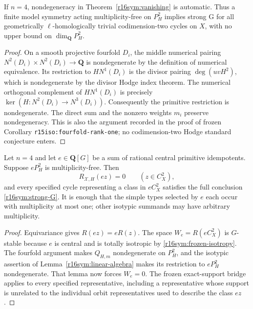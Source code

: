 \begin{corollary}
\label{r16sym:fourfold}
If $n=4$, nondegeneracy in
Theorem~\ref{r16sym:vanishing} is automatic.  Thus a finite
model symmetry acting multiplicity-free on $P_H^2$ implies
strong G for all geometrically $\ell$-homologically trivial
codimension-two cycles on $X$, with no upper bound on
$\dim_{\mathbf Q}P_H^2$.
\end{corollary}

\begin{proof}
On a smooth projective fourfold $D_i$, the middle numerical
pairing $N^2(D_i)\times N^2(D_i)\to\mathbf Q$ is
nondegenerate by the definition of numerical equivalence.
Its restriction to $HN^1(D_i)$ is the divisor pairing
$\deg(uvH^2)$, which is nondegenerate by the divisor Hodge
index theorem.  The numerical orthogonal complement of
$HN^1(D_i)$ is precisely
$\ker(H:N^2(D_i)\to N^3(D_i))$.  Consequently the primitive
restriction is nondegenerate.  The direct sum and the
nonzero weights $m_i$ preserve nondegeneracy.  This is also
the argument recorded in the proof of frozen Corollary
\texttt{r15iso:fourfold-rank-one}; no codimension-two Hodge
standard conjecture enters.
\end{proof}

\begin{corollary}
\label{r16sym:sectors}
Let $n=4$ and let $e\in\mathbf Q[G]$ be a sum of rational
central primitive idempotents.  Suppose $eP_H^2$ is
multiplicity-free.  Then
\[
                 R_{\mathcal X,H}(ez)=0
                              \qquad(z\in C_X^2),
\tag{ER16.8}\label{r16sym:isotypic-vanishing}
\]
and every specified cycle representing a class in $eC_X^2$
satisfies the full conclusion \eqref{r16sym:strong-G}.
It is enough that the simple types selected by $e$ each
occur with multiplicity at most one; other isotypic
summands may have arbitrary multiplicity.
\end{corollary}

\begin{proof}
Equivariance gives $R(ez)=eR(z)$.  The space
$W_e=R(eC_X^2)$ is $G$-stable because $e$ is central and
is totally isotropic by \eqref{r16sym:frozen-isotropy}.
The fourfold argument makes $Q_{H,m}$ nondegenerate on
$P_H^2$, and the isotypic assertion of
Lemma~\ref{r16sym:linear-algebra} makes its restriction to
$eP_H^2$ nondegenerate.  That lemma now forces $W_e=0$.
The frozen exact-support bridge applies to every specified
representative, including a representative whose support
is unrelated to the individual orbit representatives
used to describe the class $ez$.
\end{proof}

